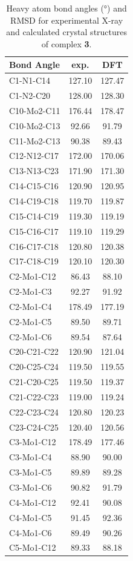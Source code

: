 \begin{table}[]
\centering
\caption{Heavy atom bond angles (°) and RMSD for experimental X-ray and calculated crystal structures of complex \textbf{3}.} \label{tab:angles3}
\begin{tabular}{lcc}
\textbf{Bond Angle} & \textbf{exp.} & \textbf{DFT} \\ \hline
C1-N1-C14 & 127.10 & 127.47 \\
C1-N2-C20 & 128.00 & 128.30 \\
C10-Mo2-C11 & 176.44 & 178.47 \\
C10-Mo2-C13 & 92.66 & 91.79 \\
C11-Mo2-C13 & 90.38 & 89.43 \\
C12-N12-C17 & 172.00 & 170.06 \\
C13-N13-C23 & 171.90 & 171.30 \\
C14-C15-C16 & 120.90 & 120.95 \\
C14-C19-C18 & 119.70 & 119.87 \\
C15-C14-C19 & 119.30 & 119.19 \\
C15-C16-C17 & 119.10 & 119.29 \\
C16-C17-C18 & 120.80 & 120.38 \\
C17-C18-C19 & 120.10 & 120.30 \\
C2-Mo1-C12 & 86.43 & 88.10 \\
C2-Mo1-C3 & 92.27 & 91.92 \\
C2-Mo1-C4 & 178.49 & 177.19 \\
C2-Mo1-C5 & 89.50 & 89.71 \\
C2-Mo1-C6 & 89.54 & 87.64 \\
C20-C21-C22 & 120.90 & 121.04 \\
C20-C25-C24 & 119.50 & 119.55 \\
C21-C20-C25 & 119.50 & 119.37 \\
C21-C22-C23 & 119.00 & 119.24 \\
C22-C23-C24 & 120.80 & 120.23 \\
C23-C24-C25 & 120.40 & 120.56 \\
C3-Mo1-C12 & 178.49 & 177.46 \\
C3-Mo1-C4 & 88.90 & 90.00 \\
C3-Mo1-C5 & 89.89 & 89.28 \\
C3-Mo1-C6 & 90.82 & 91.79 \\
C4-Mo1-C12 & 92.41 & 90.08 \\
C4-Mo1-C5 & 91.45 & 92.36 \\
C4-Mo1-C6 & 89.49 & 90.26 \\
C5-Mo1-C12 & 89.33 & 88.18 \\

\end{tabular}
\end{table}
